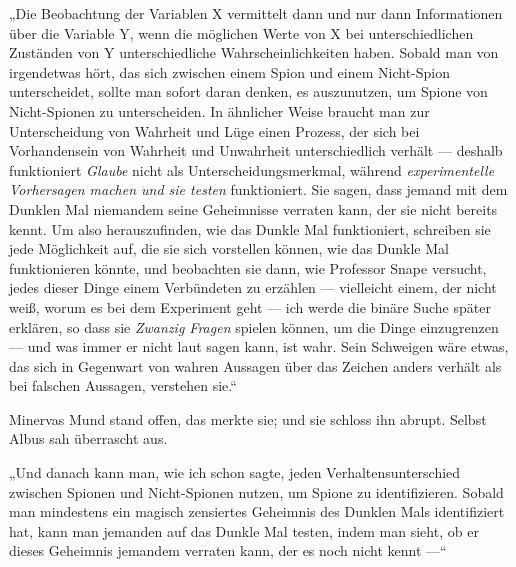 „Die Beobachtung der Variablen X vermittelt dann und nur dann Informationen über die Variable Y, wenn die möglichen Werte von X bei unterschiedlichen Zuständen von Y unterschiedliche Wahrscheinlichkeiten haben. Sobald man von irgendetwas hört, das sich zwischen einem Spion und einem Nicht-Spion unterscheidet, sollte man sofort daran denken, es auszunutzen, um Spione von Nicht-Spionen zu unterscheiden. In ähnlicher Weise braucht man zur Unterscheidung von Wahrheit und Lüge einen Prozess, der sich bei Vorhandensein von Wahrheit und Unwahrheit unterschiedlich verhält — deshalb funktioniert \emph{Glaube} nicht als Unterscheidungsmerkmal, während \emph{experimentelle Vorhersagen machen und sie testen} funktioniert. Sie sagen, dass jemand mit dem Dunklen Mal niemandem seine Geheimnisse verraten kann, der sie nicht bereits kennt. Um also herauszufinden, wie das Dunkle Mal funktioniert, schreiben sie jede Möglichkeit auf, die sie sich vorstellen können, wie das Dunkle Mal funktionieren könnte, und beobachten sie dann, wie Professor Snape versucht, jedes dieser Dinge einem Verbündeten zu erzählen — vielleicht einem, der nicht weiß, worum es bei dem Experiment geht — ich werde die binäre Suche später erklären, so dass sie \emph{Zwanzig Fragen} spielen können, um die Dinge einzugrenzen — und was immer er nicht laut sagen kann, ist wahr. Sein Schweigen wäre etwas, das sich in Gegenwart von wahren Aussagen über das Zeichen anders verhält als bei falschen Aussagen, verstehen sie.“

Minervas Mund stand offen, das merkte sie; und sie schloss ihn abrupt. Selbst Albus sah überrascht aus.

„Und danach kann man, wie ich schon sagte, jeden Verhaltensunterschied zwischen Spionen und Nicht-Spionen nutzen, um Spione zu identifizieren. Sobald man mindestens ein magisch zensiertes Geheimnis des Dunklen Mals identifiziert hat, kann man jemanden auf das Dunkle Mal testen, indem man sieht, ob er dieses Geheimnis jemandem verraten kann, der es noch nicht kennt —“


